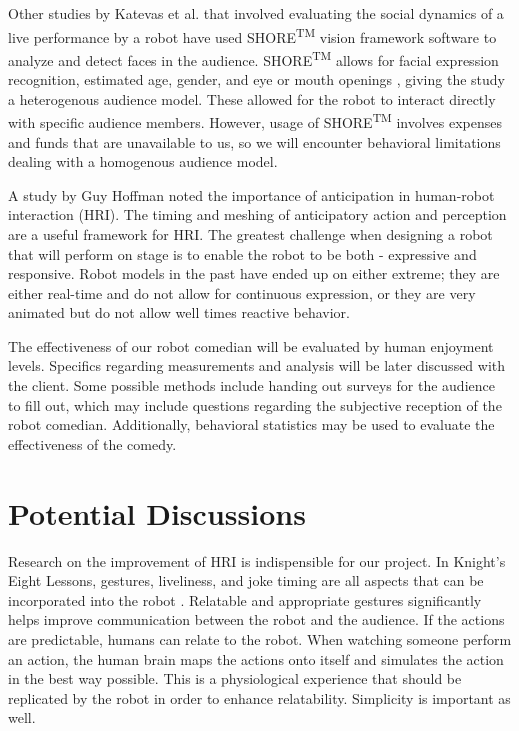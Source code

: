 \documentclass[onecolumn, draftclsnofoot,10pt, compsoc]{IEEEtran}
\begin{document}
Other studies by Katevas et al. \cite{KatevasRobot:2014} that involved evaluating the social dynamics of a live performance by a robot have used SHORE\textsuperscript{TM} vision framework software to analyze and detect faces in the audience. SHORE\textsuperscript{TM} allows for facial expression recognition, estimated age, gender, and eye or mouth openings \cite{SHORE}, giving the study a heterogenous audience model. These allowed for the robot to interact directly with specific audience members. However, usage of SHORE\textsuperscript{TM} involves expenses and funds that are unavailable to us, so we will encounter behavioral limitations dealing with a homogenous audience model.

A study by Guy Hoffman {\cite{hoffman2010anticipation}} noted the importance of anticipation in human-robot interaction (HRI). The timing and meshing of anticipatory action and perception are a useful framework for HRI. The greatest challenge when designing a robot that will perform on stage is to enable the robot to be both - expressive and responsive. Robot models in the past have ended up on either extreme; they are either real-time and do not allow for continuous expression, or they are very animated but do not allow well times reactive behavior.

The effectiveness of our robot comedian will be evaluated by human enjoyment levels. Specifics regarding measurements and analysis will be later discussed with the client. Some possible methods include handing out surveys for the audience to fill out, which may include questions regarding the subjective reception of the robot comedian. Additionally, behavioral statistics may be used to evaluate the effectiveness of the comedy.

\section{Potential Discussions}

Research on the improvement of HRI is indispensible for our project. In Knight's Eight Lessons, gestures, liveliness, and joke timing are all aspects that can be incorporated into the robot {\cite{KnightEightLessons:2011}}.
Relatable and appropriate gestures significantly helps improve communication between the robot and the audience. If the actions are predictable, humans can relate to the robot.
When watching someone perform an action, the human brain maps the actions onto itself and simulates the action in the best way possible. This is a physiological experience that should be replicated by the robot in order to enhance relatability. Simplicity is important as well. {\cite{KnightEightLessons:2011}}
\end{document}

